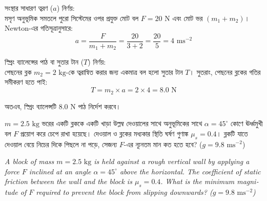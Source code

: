 \documentclass[12pt, a4paper]{article}
\begin{document}
\begin{tcolorbox}[solutionbox={সমাধান (Solution)}]
\noindent
সংস্থার সাধারণ ত্বরণ ($a$) নির্ণয়:\\
মসৃণ অনুভূমিক সমতলে পুরো সিস্টেমের ওপর প্রযুক্ত মোট বল $F = 20\text{ N}$ এবং মোট ভর $(m_1 + m_2)$। Newton-এর গতিসূত্রানুসারে:
$$a = \frac{F}{m_1 + m_2} = \frac{20}{3 + 2} = \frac{20}{5} = 4\text{ ms}^{-2}$$

স্প্রিং ব্যালেন্সের পাঠ বা সুতার টান ($T$) নির্ণয়:\\
পেছনের ব্লক $m_2 = 2\text{ kg}$-কে ত্বরান্বিত করার জন্য একমাত্র বল হলো সুতার টান $T$। সুতরাং, পেছনের ব্লকের গতির সমীকরণ হতে পাই:
$$T = m_2 \times a = 2 \times 4 = 8.0\text{ N}$$

অতএব, স্প্রিং ব্যালেন্সটি $8.0\text{ N}$ পাঠ নির্দেশ করবে।
\end{tcolorbox}
\vspace{1em}

\begin{tcolorbox}[questionbox={প্রশ্ন (Question) 19}]
\noindent
$m = 2.5\text{ kg}$ ভরের একটি ব্লককে একটি খাড়া উল্লম্ব দেওয়ালের সাথে অনুভূমিকের সাথে $\alpha = 45^\circ$ কোণে ঊর্ধ্বমুখী বল $F$ প্রয়োগ করে চেপে রাখা হয়েছে। দেওয়াল ও ব্লকের মধ্যকার স্থিতি ঘর্ষণ গুণাঙ্ক $\mu_s = 0.4$। ব্লকটি যাতে দেওয়াল বেয়ে নিচের দিকে পিছলে না পড়ে, সেজন্য $F$-এর ন্যূনতম মান কত হতে হবে? ($g = 9.8\text{ ms}^{-2}$)

\vspace{0.8em}
\begin{english}
\noindent\textit{\color{darkgray}
A block of mass $m = 2.5\text{ kg}$ is held against a rough vertical wall by applying a force $F$ inclined at an angle $\alpha = 45^\circ$ above the horizontal. The coefficient of static friction between the wall and the block is $\mu_s = 0.4$. What is the minimum magnitude of $F$ required to prevent the block from slipping downwards? ($g = 9.8\text{ ms}^{-2}$)
}
\end{english}
\end{tcolorbox}
\end{document}
